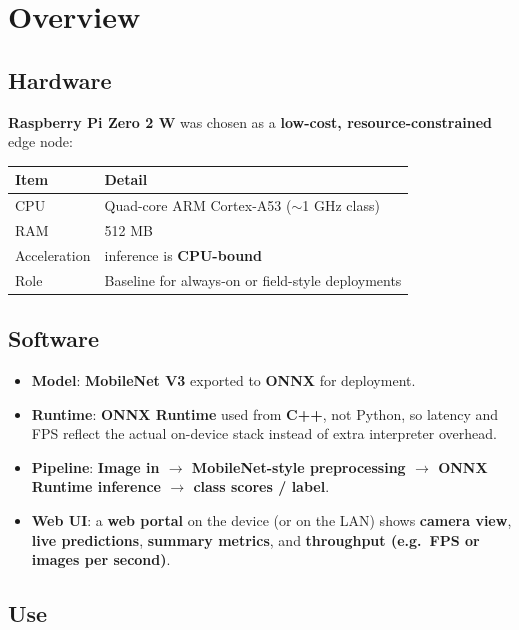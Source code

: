 \documentclass[a4paper,onesided,12pt]{report}
\begin{document}
\chapter{Overview}

\section{Hardware}

\textbf{Raspberry Pi Zero 2 W} was chosen as a \textbf{low-cost, resource-constrained} edge node:

\begin{table}[h!]
\begin{center}
\begin{tabular}{|l|l|}
\hline
\textbf{Item} & \textbf{Detail} \\
\hline
CPU & Quad-core ARM Cortex-A53 ($\sim$1 GHz class) \\
\hline
RAM & 512 MB \\
\hline
Acceleration & inference is \textbf{CPU-bound} \\
\hline
Role & Baseline for always-on or field-style deployments \\
\hline
\end{tabular}
\end{center}
\end{table}

\section{Software}

\begin{itemize}
\item \textbf{Model}: \textbf{MobileNet V3} exported to \textbf{ONNX} for deployment.
\item \textbf{Runtime}: \textbf{ONNX Runtime} used from \textbf{C++}, not Python, so latency and FPS reflect the actual on-device stack instead of extra interpreter overhead.
\item \textbf{Pipeline}: \textbf{Image in $\rightarrow$ MobileNet-style preprocessing $\rightarrow$ ONNX Runtime inference $\rightarrow$ class scores / label}.
\item \textbf{Web UI}: a \textbf{web portal} on the device (or on the LAN) shows \textbf{camera view}, \textbf{live predictions}, \textbf{summary metrics}, and \textbf{throughput (e.g.\ FPS or images per second)}.
\end{itemize}

\section{Use}
\end{document}
